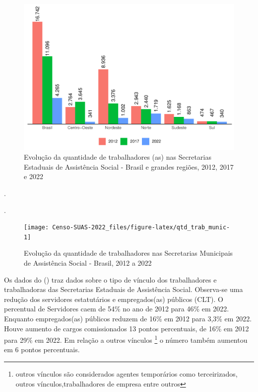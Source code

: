 \documentclass[
  brazilian]{report}
\begin{document}
\begin{figure}
\includegraphics{Censo-SUAS-2022_files/figure-latex/qtd-trab-uf-1} \caption[Evolução da quantidade de trabalhadores (as) nas Secretarias Estaduais de Assistência Social - Brasil e grandes regiões, 2012, 2017 e 2022]{Evolução da quantidade de trabalhadores (as) nas Secretarias Estaduais de Assistência Social - Brasil e grandes regiões, 2012, 2017 e 2022}\label{fig:qtd-trab-uf}
\end{figure}

.

.

\begin{figure}
\texttt{[image: Censo-SUAS-2022\_files/figure-latex/qtd\_trab\_munic-1]} \caption[Evolução da quantidade de trabalhadores nas Secretarias Municipais de Assistência Social - Brasil, 2012 a 2022]{Evolução da quantidade de trabalhadores nas Secretarias Municipais de Assistência Social - Brasil, 2012 a 2022}\label{fig:qtd_trab_munic}
\end{figure}

Os dados do () traz dados sobre o tipo de vínculo
dos trabalhadores e trabalhadoras das Secretarias Estaduais de
Assistência Social. Observa-se uma redução dos servidores estatutários e
empregados(as) públicos (CLT). O percentual de Servidores caem de 54\%
no ano de 2012 para 46\% em 2022. Enquanto empregados(as) públicos
reduzem de 16\% em 2012 para 3,3\% em 2022. Houve aumento de cargos
comissionados 13 pontos percentuais, de 16\% em 2012 para 29\% em 2022.
Em relação a outros vínculos
\footnote{outros vínculos são considerados agentes temporários como terceirizados, outros vínculos,trabalhadores de empresa entre outros}
o número também aumentou em 6 pontos percentuais.
\end{document}
